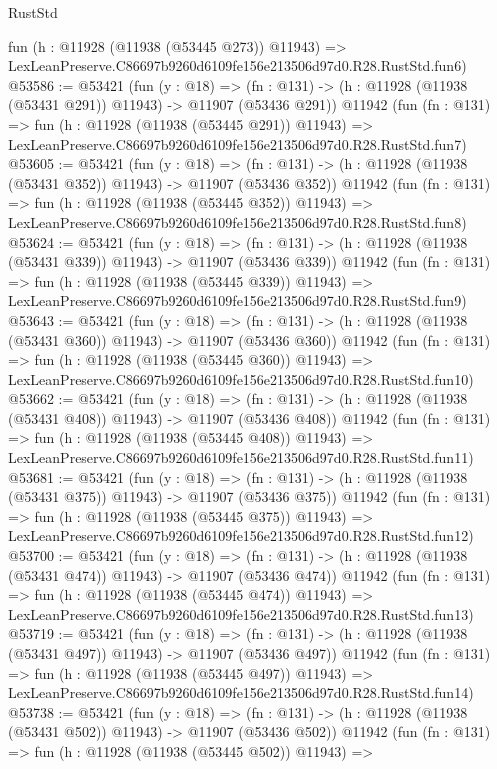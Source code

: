 \begin{lexlean}{RustStd}
\begin{coremodule}
    fun (h : @11928 (@11938 (@53445 @273)) @11943) =>
    LexLeanPreserve.C86697b9260d6109fe156e213506d97d0.R28.RustStd.fun6)
@53586 := @53421
    (fun (y : @18) =>
    (fn : @131) -> (h : @11928 (@11938 (@53431 @291)) @11943) -> @11907 (@53436 @291))
    @11942
    (fun (fn : @131) =>
    fun (h : @11928 (@11938 (@53445 @291)) @11943) =>
    LexLeanPreserve.C86697b9260d6109fe156e213506d97d0.R28.RustStd.fun7)
@53605 := @53421
    (fun (y : @18) =>
    (fn : @131) -> (h : @11928 (@11938 (@53431 @352)) @11943) -> @11907 (@53436 @352))
    @11942
    (fun (fn : @131) =>
    fun (h : @11928 (@11938 (@53445 @352)) @11943) =>
    LexLeanPreserve.C86697b9260d6109fe156e213506d97d0.R28.RustStd.fun8)
@53624 := @53421
    (fun (y : @18) =>
    (fn : @131) -> (h : @11928 (@11938 (@53431 @339)) @11943) -> @11907 (@53436 @339))
    @11942
    (fun (fn : @131) =>
    fun (h : @11928 (@11938 (@53445 @339)) @11943) =>
    LexLeanPreserve.C86697b9260d6109fe156e213506d97d0.R28.RustStd.fun9)
@53643 := @53421
    (fun (y : @18) =>
    (fn : @131) -> (h : @11928 (@11938 (@53431 @360)) @11943) -> @11907 (@53436 @360))
    @11942
    (fun (fn : @131) =>
    fun (h : @11928 (@11938 (@53445 @360)) @11943) =>
    LexLeanPreserve.C86697b9260d6109fe156e213506d97d0.R28.RustStd.fun10)
@53662 := @53421
    (fun (y : @18) =>
    (fn : @131) -> (h : @11928 (@11938 (@53431 @408)) @11943) -> @11907 (@53436 @408))
    @11942
    (fun (fn : @131) =>
    fun (h : @11928 (@11938 (@53445 @408)) @11943) =>
    LexLeanPreserve.C86697b9260d6109fe156e213506d97d0.R28.RustStd.fun11)
@53681 := @53421
    (fun (y : @18) =>
    (fn : @131) -> (h : @11928 (@11938 (@53431 @375)) @11943) -> @11907 (@53436 @375))
    @11942
    (fun (fn : @131) =>
    fun (h : @11928 (@11938 (@53445 @375)) @11943) =>
    LexLeanPreserve.C86697b9260d6109fe156e213506d97d0.R28.RustStd.fun12)
@53700 := @53421
    (fun (y : @18) =>
    (fn : @131) -> (h : @11928 (@11938 (@53431 @474)) @11943) -> @11907 (@53436 @474))
    @11942
    (fun (fn : @131) =>
    fun (h : @11928 (@11938 (@53445 @474)) @11943) =>
    LexLeanPreserve.C86697b9260d6109fe156e213506d97d0.R28.RustStd.fun13)
@53719 := @53421
    (fun (y : @18) =>
    (fn : @131) -> (h : @11928 (@11938 (@53431 @497)) @11943) -> @11907 (@53436 @497))
    @11942
    (fun (fn : @131) =>
    fun (h : @11928 (@11938 (@53445 @497)) @11943) =>
    LexLeanPreserve.C86697b9260d6109fe156e213506d97d0.R28.RustStd.fun14)
@53738 := @53421
    (fun (y : @18) =>
    (fn : @131) -> (h : @11928 (@11938 (@53431 @502)) @11943) -> @11907 (@53436 @502))
    @11942
    (fun (fn : @131) =>
    fun (h : @11928 (@11938 (@53445 @502)) @11943) =>

\end{coremodule}
\end{lexlean}

